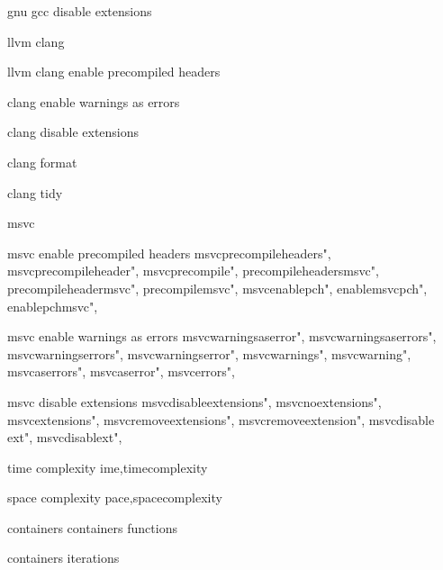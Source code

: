          gnu gcc disable extensions 
        
         llvm clang 
        
         llvm clang enable precompiled headers 
        
         clang enable warnings as errors
        
         clang disable extensions 
        
         clang format 
        
         clang tidy 
        
         msvc  
        
         msvc enable precompiled headers 
        msvcprecompileheaders",  
        msvcprecompileheader",  
        msvcprecompile",  
        precompileheadersmsvc",  
        precompileheadermsvc",  
        precompilemsvc",  
        msvcenablepch",  
        enablemsvcpch",  
        enablepchmsvc",  
        
         msvc enable warnings as errors
        msvcwarningsaserror", 
        msvcwarningsaserrors", 
        msvcwarningserrors", 
        msvcwarningserror", 
        msvcwarnings", 
        msvcwarning", 
        msvcaserrors", 
        msvcaserror", 
        msvcerrors", 
        
         msvc disable extensions 
        msvcdisableextensions", 
        msvcnoextensions", 
        msvcextensions", 
        msvcremoveextensions", 
        msvcremoveextension", 
        msvcdisable ext", 
        msvcdisablext", 

         time complexity
        ime,timecomplexity
        
         space complexity
        pace,spacecomplexity
        
         containers
         containers functions
        
         containers iterations
        
